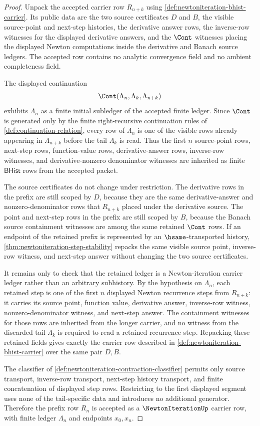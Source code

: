 \begin{proof}
Unpack the accepted carrier row $R_{n+k}$ using \autoref{def:newtoniteration-bhist-carrier}. Its public data are the two source certificates $D$ and $B$, the visible source-point and next-step histories, the derivative answer rows, the inverse-row witnesses for the displayed derivative answers, and the $\Cont$ witnesses placing the displayed Newton computations inside the derivative and Banach source ledgers. The accepted row contains no analytic convergence field and no ambient completeness field.

The displayed continuation
$$
\Cont(\Lambda_n,\Lambda_k,\Lambda_{n+k})
$$
exhibits $\Lambda_n$ as a finite initial subledger of the accepted finite ledger. Since $\Cont$ is generated only by the finite right-recursive continuation rules of \autoref{def:continuation-relation}, every row of $\Lambda_n$ is one of the visible rows already appearing in $\Lambda_{n+k}$ before the tail $\Lambda_k$ is read. Thus the first $n$ source-point rows, next-step rows, function-value rows, derivative-answer rows, inverse-row witnesses, and derivative-nonzero denominator witnesses are inherited as finite $\mathsf{BHist}$ rows from the accepted packet.

The source certificates do not change under restriction. The derivative rows in the prefix are still scoped by $D$, because they are the same derivative-answer and nonzero-denominator rows that $R_{n+k}$ placed under the derivative source. The point and next-step rows in the prefix are still scoped by $B$, because the Banach source containment witnesses are among the same retained $\Cont$ rows. If an endpoint of the retained prefix is represented by an $\hsame$-transported history, \autoref{thm:newtoniteration-step-stability} repacks the same visible source point, inverse-row witness, and next-step answer without changing the two source certificates.

It remains only to check that the retained ledger is a Newton-iteration carrier ledger rather than an arbitrary subhistory. By the hypothesis on $\Lambda_n$, each retained step is one of the first $n$ displayed Newton recurrence steps from $R_{n+k}$: it carries its source point, function value, derivative answer, inverse-row witness, nonzero-denominator witness, and next-step answer. The containment witnesses for those rows are inherited from the longer carrier, and no witness from the discarded tail $\Lambda_k$ is required to read a retained recurrence step. Repacking these retained fields gives exactly the carrier row described in \autoref{def:newtoniteration-bhist-carrier} over the same pair $D,B$.

The classifier of \autoref{def:newtoniteration-contraction-classifier} permits only source transport, inverse-row transport, next-step history transport, and finite concatenation of displayed step rows. Restricting to the first displayed segment uses none of the tail-specific data and introduces no additional generator. Therefore the prefix row $R_n$ is accepted as a $\NewtonIterationUp$ carrier row, with finite ledger $\Lambda_n$ and endpoints $x_0,x_n$.
\end{proof}
